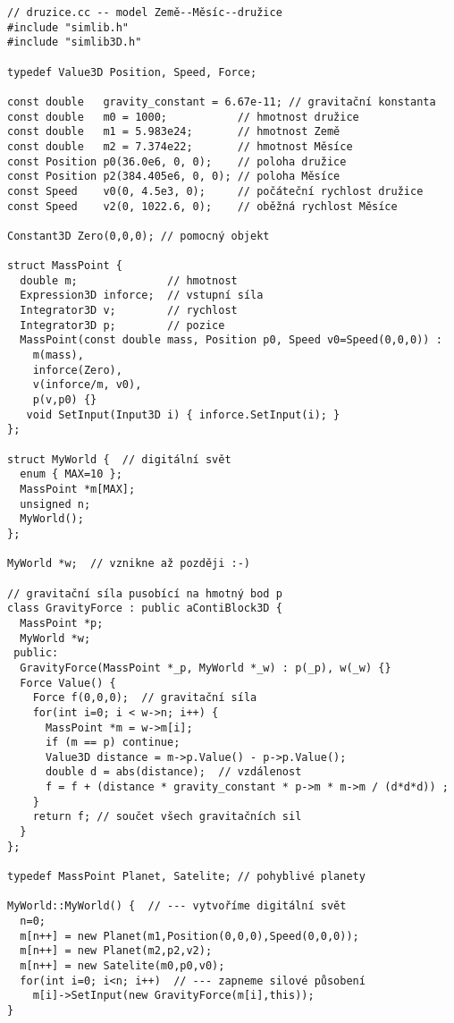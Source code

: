 \documentclass[a4paper]{article}
\begin{document}
{
\small
\begin{verbatim}
// druzice.cc -- model Země--Měsíc--družice 
#include "simlib.h"
#include "simlib3D.h"

typedef Value3D Position, Speed, Force;

const double   gravity_constant = 6.67e-11; // gravitační konstanta
const double   m0 = 1000;           // hmotnost družice
const double   m1 = 5.983e24;       // hmotnost Země
const double   m2 = 7.374e22;       // hmotnost Měsíce
const Position p0(36.0e6, 0, 0);    // poloha družice
const Position p2(384.405e6, 0, 0); // poloha Měsíce
const Speed    v0(0, 4.5e3, 0);     // počáteční rychlost družice
const Speed    v2(0, 1022.6, 0);    // oběžná rychlost Měsíce

Constant3D Zero(0,0,0); // pomocný objekt

struct MassPoint {
  double m;              // hmotnost
  Expression3D inforce;  // vstupní síla
  Integrator3D v;        // rychlost
  Integrator3D p;        // pozice
  MassPoint(const double mass, Position p0, Speed v0=Speed(0,0,0)) :
    m(mass), 
    inforce(Zero),
    v(inforce/m, v0), 
    p(v,p0) {}
   void SetInput(Input3D i) { inforce.SetInput(i); }
};

struct MyWorld {  // digitální svět
  enum { MAX=10 };
  MassPoint *m[MAX];
  unsigned n;
  MyWorld();
};

MyWorld *w;  // vznikne až později :-)

// gravitační síla pusobící na hmotný bod p
class GravityForce : public aContiBlock3D {
  MassPoint *p;
  MyWorld *w;
 public:
  GravityForce(MassPoint *_p, MyWorld *_w) : p(_p), w(_w) {} 
  Force Value() {
    Force f(0,0,0);  // gravitační síla
    for(int i=0; i < w->n; i++) {
      MassPoint *m = w->m[i];
      if (m == p) continue;
      Value3D distance = m->p.Value() - p->p.Value(); 
      double d = abs(distance);  // vzdálenost
      f = f + (distance * gravity_constant * p->m * m->m / (d*d*d)) ; 
    }
    return f; // součet všech gravitačních sil 
  }
};

typedef MassPoint Planet, Satelite; // pohyblivé planety

MyWorld::MyWorld() {  // --- vytvoříme digitální svět
  n=0;
  m[n++] = new Planet(m1,Position(0,0,0),Speed(0,0,0));
  m[n++] = new Planet(m2,p2,v2);
  m[n++] = new Satelite(m0,p0,v0);
  for(int i=0; i<n; i++)  // --- zapneme silové působení
    m[i]->SetInput(new GravityForce(m[i],this));
}
\end{verbatim}
}
\end{document}
